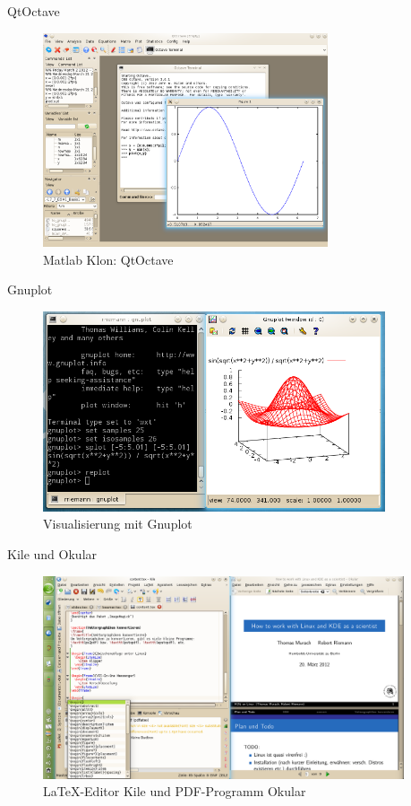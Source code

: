 \begin{frame}{QtOctave}
  \begin{figure}
    \includegraphics[keepaspectratio=true,width=0.75\textwidth]{qtoctave}
    \caption{Matlab Klon: QtOctave}
  \end{figure}
\end{frame}

\begin{frame}{Gnuplot}
  \begin{figure}
    \includegraphics[keepaspectratio=true,width=0.9\textwidth]{gnuplot}
    \caption{Visualisierung mit Gnuplot}
  \end{figure}  
\end{frame}


\begin{frame}{Kile und Okular}
  \begin{figure}
    \includegraphics[keepaspectratio=true,width=0.95\textwidth]{kile}
    \caption{\LaTeX-Editor Kile und PDF-Programm Okular}
  \end{figure}
\end{frame}

